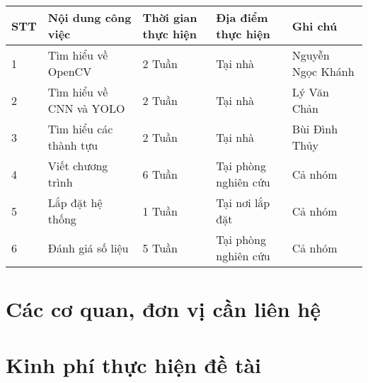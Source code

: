 \documentclass[12pt,twoside,a4paper]{article}
\begin{document}
\renewcommand{\arraystretch}{2}
\begin{center}
	\begin{tabular}{|p{10mm}|p{48mm}|p{22mm}|p{26mm}|l|} 
		\hline 
		STT & Nội dung công việc & Thời gian thực hiện & Địa điểm thực hiện & Ghi chú \\ 
		\hline
		1 & Tìm hiểu về OpenCV & 2 Tuần & Tại nhà & Nguyễn Ngọc Khánh \\
		\hline
		2 & Tìm hiểu về CNN và YOLO & 2 Tuần & Tại nhà & Lý Văn Chản \\
		\hline
		3 & Tìm hiểu các thành tựu & 2 Tuần & Tại nhà & Bùi Đình Thủy \\
		\hline
		4 & Viết chương trình & 6 Tuần & Tại phòng nghiên cứu & Cả nhóm \\
		\hline
		5 & Lắp đặt hệ thống & 1 Tuần & Tại nơi lắp đặt & Cả nhóm \\
		\hline
		6 & Đánh giá số liệu & 5 Tuần & Tại phòng nghiên cứu & Cả nhóm \\
		\hline
	\end{tabular}
\end{center}
\section{Các cơ quan, đơn vị cần liên hệ}
\section{Kinh phí thực hiện đề tài}

\pagebreak

\end{document}
